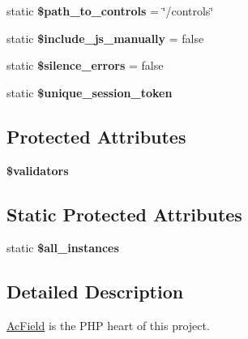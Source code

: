 \begin{DoxyCompactItemize}
\item 
\hypertarget{class_ac_field_aa2e1258c777379b9b2ca46420405608c}{static {\bfseries \$path\-\_\-to\-\_\-controls} = \char`\"{}/controls\char`\"{}}\label{class_ac_field_aa2e1258c777379b9b2ca46420405608c}

\item 
\hypertarget{class_ac_field_a913f33a5cb24c4f9fe05186811492b3b}{static {\bfseries \$include\-\_\-js\-\_\-manually} = false}\label{class_ac_field_a913f33a5cb24c4f9fe05186811492b3b}

\item 
\hypertarget{class_ac_field_a92bf4433ecbb3346d9829ec780ef0334}{static {\bfseries \$silence\-\_\-errors} = false}\label{class_ac_field_a92bf4433ecbb3346d9829ec780ef0334}

\item 
\hypertarget{class_ac_field_af917ffed961cc1d116330a1cb0cbf8ff}{static {\bfseries \$unique\-\_\-session\-\_\-token}}\label{class_ac_field_af917ffed961cc1d116330a1cb0cbf8ff}

\end{DoxyCompactItemize}
\subsection*{\-Protected \-Attributes}
\begin{DoxyCompactItemize}
\item 
\hypertarget{class_ac_field_a92dc1d646f00c393e2ed76a7ec06e76b}{{\bfseries \$validators}}\label{class_ac_field_a92dc1d646f00c393e2ed76a7ec06e76b}

\end{DoxyCompactItemize}
\subsection*{\-Static \-Protected \-Attributes}
\begin{DoxyCompactItemize}
\item 
\hypertarget{class_ac_field_ae734a067d4407f6c8cde0815f0cdfc84}{static {\bfseries \$all\-\_\-instances}}\label{class_ac_field_ae734a067d4407f6c8cde0815f0cdfc84}

\end{DoxyCompactItemize}


\subsection{\-Detailed \-Description}
\hyperlink{class_ac_field}{\-Ac\-Field} is the \-P\-H\-P heart of this project.

